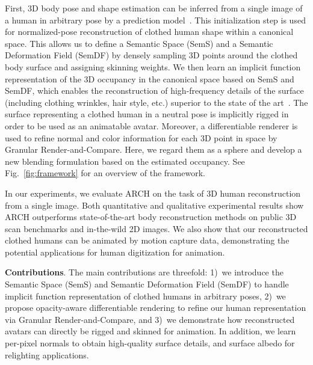 \documentclass[10pt,twocolumn,letterpaper]{article}
\begin{document}
First, 3D body pose and shape estimation can be inferred from a single image of
a human in arbitrary pose by a prediction model~\cite{DenseRaCICCV19}. This initialization step is used for normalized-pose reconstruction of clothed human shape within a canonical space. This allows us to define a Semantic Space (SemS) and a Semantic Deformation Field (SemDF) by densely sampling 3D points around the clothed body surface and assigning skinning weights.
We then learn an implicit function representation of the 3D occupancy in the canonical space based on SemS and SemDF, which enables the reconstruction of high-frequency details of the surface (including clothing wrinkles, hair style, etc.) superior to the state of the art~\cite{SiCloPeCVPR19,PIFuICCV19,varol18_bodynet}. The surface representing a clothed human in a neutral pose is implicitly rigged in order to be used as an animatable avatar. 
Moreover, a differentiable renderer is used to refine normal and color information for each 3D point in space by Granular Render-and-Compare. Here, we regard them as a sphere and develop a new blending formulation based on the estimated occupancy.
See Fig.~\ref{fig:framework} for an overview of the framework.




In our experiments, we evaluate ARCH on the task of 3D human reconstruction from a single image.
Both quantitative and qualitative experimental results show ARCH outperforms state-of-the-art body reconstruction methods on public 3D scan benchmarks and in-the-wild 2D images. We also show that our reconstructed clothed humans can be animated by motion capture data, demonstrating the potential applications for human digitization for animation.

\textbf{Contributions}. The main contributions are threefold: 1)~we introduce the Semantic Space (SemS) and Semantic Deformation Field (SemDF) to handle implicit function representation of clothed humans in arbitrary poses, 2)~we propose opacity-aware differentiable rendering to refine our human representation via Granular Render-and-Compare, and 3)~we demonstrate how reconstructed avatars can directly be rigged and skinned for animation.
In addition, we learn per-pixel normals to obtain high-quality surface details, and surface albedo for relighting applications.
\end{document}
